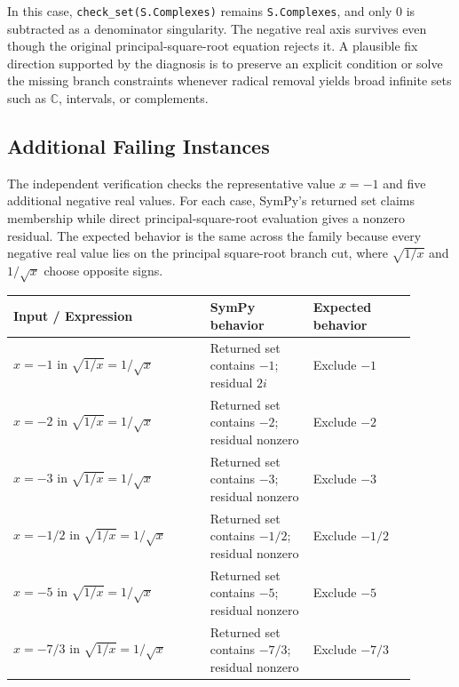 \documentclass[11pt]{article}
\begin{document}
In this case, \texttt{check\_set(S.Complexes)} remains \texttt{S.Complexes}, and only \(0\) is subtracted as a denominator singularity. The negative real axis survives even though the original principal-square-root equation rejects it. A plausible fix direction supported by the diagnosis is to preserve an explicit condition or solve the missing branch constraints whenever radical removal yields broad infinite sets such as \(\mathbb{C}\), intervals, or complements.

\subsection{Additional Failing Instances}

The independent verification checks the representative value \(x=-1\) and five additional negative real values. For each case, SymPy's returned set claims membership while direct principal-square-root evaluation gives a nonzero residual. The expected behavior is the same across the family because every negative real value lies on the principal square-root branch cut, where \(\sqrt{1/x}\) and \(1/\sqrt{x}\) choose opposite signs.

\begin{center}
\small
\renewcommand{\arraystretch}{1.3}
\begin{tabular}{@{}>{\raggedright\arraybackslash}p{0.44\linewidth}>{\raggedright\arraybackslash}p{0.23\linewidth}>{\raggedright\arraybackslash}p{0.23\linewidth}@{}}
\toprule
\textbf{Input / Expression} & \textbf{SymPy behavior} & \textbf{Expected behavior} \\
\midrule
\(x=-1\) in \(\sqrt{1/x}=1/\sqrt{x}\) & Returned set contains \(-1\); residual \(2i\) & Exclude \(-1\) \\
\(x=-2\) in \(\sqrt{1/x}=1/\sqrt{x}\) & Returned set contains \(-2\); residual nonzero & Exclude \(-2\) \\
\(x=-3\) in \(\sqrt{1/x}=1/\sqrt{x}\) & Returned set contains \(-3\); residual nonzero & Exclude \(-3\) \\
\(x=-1/2\) in \(\sqrt{1/x}=1/\sqrt{x}\) & Returned set contains \(-1/2\); residual nonzero & Exclude \(-1/2\) \\
\(x=-5\) in \(\sqrt{1/x}=1/\sqrt{x}\) & Returned set contains \(-5\); residual nonzero & Exclude \(-5\) \\
\(x=-7/3\) in \(\sqrt{1/x}=1/\sqrt{x}\) & Returned set contains \(-7/3\); residual nonzero & Exclude \(-7/3\) \\
\bottomrule
\end{tabular}
\end{center}
\end{document}
